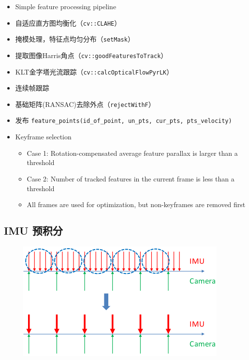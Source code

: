 \documentclass[12pt,a4paper]{article}
\begin{document}
\begin{itemize}

  \item Simple feature processing pipeline
  \item 自适应直方图均衡化（\verb|cv::CLAHE|）
  \item 掩模处理，特征点均匀分布（\verb|setMask|）
  \item 提取图像Harris角点（\verb|cv::goodFeaturesToTrack|）
  \item KLT金字塔光流跟踪（\verb|cv::calcOpticalFlowPyrLK|）
  \item 连续帧跟踪
  \item 基础矩阵(RANSAC)去除外点（\verb|rejectWithF|）
  \item 发布 \verb|feature_points(id_of_point, un_pts, cur_pts, pts_velocity)|
  \item Keyframe selection
  
  \begin{itemize}
  \item Case 1: Rotation-compensated average feature parallax is larger than a threshold
  \item Case 2: Number of tracked features in the current frame is less than a threshold
  \item All frames are used for optimization, but non-keyframes are removed first
  \end{itemize}  
  
\end{itemize}  

\subsection{IMU 预积分}

\begin{figure}[htbp]
\centering
\includegraphics[scale=0.6]{images/imu_integration_01.png}
\end{figure}
\end{document}
